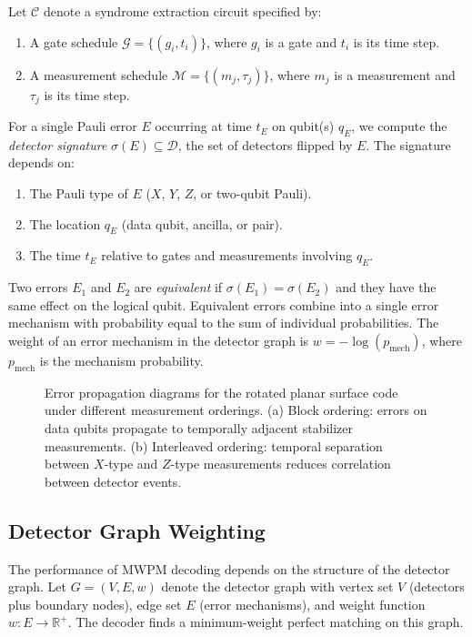 \documentclass[
    reprint,
    aps,
    prx,
    superscriptaddress,
    longbibliography
]{revtex4-2}
\begin{document}
Let $\mathcal{C}$ denote a syndrome extraction circuit specified by:
\begin{enumerate}[label=(\roman*)]
    \item A gate schedule $\mathcal{G} = \{(g_i, t_i)\}$, where $g_i$ is a gate and $t_i$ is its time step.
    \item A measurement schedule $\mathcal{M} = \{(m_j, \tau_j)\}$, where $m_j$ is a measurement and $\tau_j$ is its time step.
\end{enumerate}

For a single Pauli error $E$ occurring at time $t_E$ on qubit(s) $q_E$, we compute the \emph{detector signature} $\sigma(E) \subseteq \mathcal{D}$, the set of detectors flipped by $E$. The signature depends on:
\begin{enumerate}[label=(\roman*)]
    \item The Pauli type of $E$ ($X$, $Y$, $Z$, or two-qubit Pauli).
    \item The location $q_E$ (data qubit, ancilla, or pair).
    \item The time $t_E$ relative to gates and measurements involving $q_E$.
\end{enumerate}

Two errors $E_1$ and $E_2$ are \emph{equivalent} if $\sigma(E_1) = \sigma(E_2)$ and they have the same effect on the logical qubit. Equivalent errors combine into a single error mechanism with probability equal to the sum of individual probabilities. The weight of an error mechanism in the detector graph is $w = -\log(p_{\text{mech}})$, where $p_{\text{mech}}$ is the mechanism probability.

\begin{figure}[t]
    \caption{Error propagation diagrams for the rotated planar surface code under different measurement orderings. (a) Block ordering: errors on data qubits propagate to temporally adjacent stabilizer measurements. (b) Interleaved ordering: temporal separation between $X$-type and $Z$-type measurements reduces correlation between detector events.}
    \label{fig:error_propagation}
\end{figure}

\subsection{Detector Graph Weighting}
\label{subsec:detector_weighting}

The performance of MWPM decoding depends on the structure of the detector graph. Let $G = (V, E, w)$ denote the detector graph with vertex set $V$ (detectors plus boundary nodes), edge set $E$ (error mechanisms), and weight function $w: E \to \mathbb{R}^+$. The decoder finds a minimum-weight perfect matching on this graph.
\end{document}
